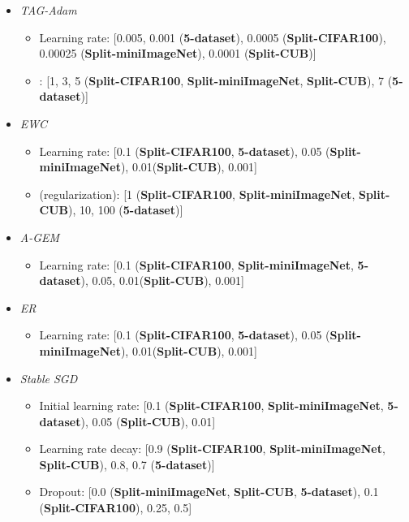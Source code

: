 \documentclass{article} \usepackage{collas2022_conference,times}
\begin{document}
\begin{itemize}
\begin{itemize}
    \end{itemize}
    \item \textit{TAG-Adam}
    \begin{itemize}
        \item Learning rate: [0.005, 0.001 (\textbf{5-dataset}), 0.0005 (\textbf{Split-CIFAR100}), 0.00025 (\textbf{Split-miniImageNet}), 0.0001 (\textbf{Split-CUB})]
        \item : [1, 3, 5 (\textbf{Split-CIFAR100}, \textbf{Split-miniImageNet}, \textbf{Split-CUB}), 7 (\textbf{5-dataset})] 
    \end{itemize}
    \item \textit{EWC}
    \begin{itemize}
        \item Learning rate: [0.1 (\textbf{Split-CIFAR100}, \textbf{5-dataset}), 0.05 (\textbf{Split-miniImageNet}), 0.01(\textbf{Split-CUB}), 0.001]
        \item  (regularization): [1 (\textbf{Split-CIFAR100}, \textbf{Split-miniImageNet}, \textbf{Split-CUB}), 10, 100 (\textbf{5-dataset})]
    \end{itemize}
    \item \textit{A-GEM}
    \begin{itemize}
        \item Learning rate: [0.1 (\textbf{Split-CIFAR100}, \textbf{Split-miniImageNet}, \textbf{5-dataset}), 0.05, 0.01(\textbf{Split-CUB}), 0.001]
    \end{itemize}
    \item \textit{ER}
    \begin{itemize}
        \item Learning rate: [0.1 (\textbf{Split-CIFAR100}, \textbf{5-dataset}), 0.05 (\textbf{Split-miniImageNet}), 0.01(\textbf{Split-CUB}), 0.001]
    \end{itemize}
    \item \textit{Stable SGD}
    \begin{itemize}
        \item Initial learning rate: [0.1 (\textbf{Split-CIFAR100}, \textbf{Split-miniImageNet}, \textbf{5-dataset}), 0.05 (\textbf{Split-CUB}), 0.01]
        \item Learning rate decay: [0.9 (\textbf{Split-CIFAR100}, \textbf{Split-miniImageNet}, \textbf{Split-CUB}), 0.8, 0.7 (\textbf{5-dataset})]
        \item Dropout: [0.0 (\textbf{Split-miniImageNet}, \textbf{Split-CUB}, \textbf{5-dataset}), 0.1 (\textbf{Split-CIFAR100}), 0.25, 0.5]
    \end{itemize}

\end{itemize}
\end{document}
